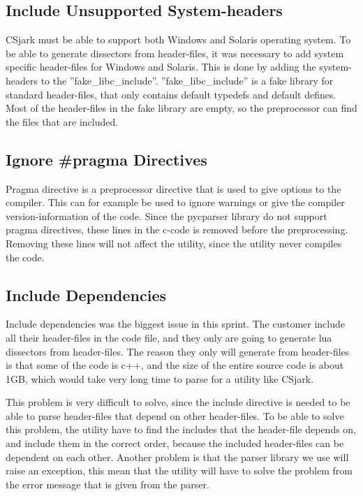 \subsection{Include Unsupported System-\glspl{header}}
CSjark must be able to support both Windows and Solaris operating system. To 
be able to generate dissectors from header-files, it was necessary to add 
system specific header-files for Windows and Solaris. This is done by adding 
the system-headers to the ''fake\_libc\_include''. ''fake\_libc\_include'' is 
a fake library for standard header-files, that only contains default typedefs 
and default defines. Most of the header-files in the fake library are empty, 
so the preprocessor can find the files that are included.

\subsection{Ignore \#pragma Directives}
Pragma directive is a \gls{preprocessor} directive that is used to give options to 
the compiler. This can for example be used to ignore warnings or give the 
compiler version-information of the code. Since the pycparser \gls{library} do not 
support pragma directives, these lines in the \Gls{c}-code is removed before the 
preprocessing. Removing these lines will not affect the \gls{utility}, since the 
\gls{utility} never compiles the code.

\subsection{Include Dependencies}
Include dependencies was the biggest issue in this sprint. The customer 
include all their \gls{header}-files in the code file, and they only are going to 
generate \Gls{lua} \glspl{dissector} from \gls{header}-files. The reason they only will generate 
from \gls{header}-files is that some of the code is \gls{c++}, and the size of the entire 
source code is about 1GB, which would take very long time to parse for a 
\gls{utility} like CSjark. 

This problem is very difficult to solve, since the include directive is needed 
to be able to parse \gls{header}-files that depend on other \gls{header}-files. To be able 
to solve this problem, the \gls{utility} have to find the includes that the 
\gls{header}-file depends on, and include them in the correct order, because the 
included \gls{header}-files can be dependent on each other. Another problem is 
that the parser library we use will raise an exception, this mean that the 
utility will have to solve the problem from the error message that is given 
from the parser.

